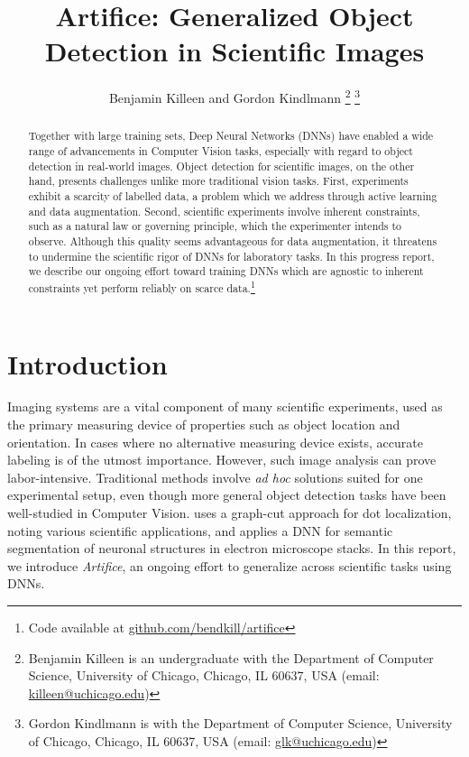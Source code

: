 \documentclass[10pt, journal]{IEEEtran}
\title{Artifice: Generalized Object Detection in Scientific Images}
\author{Benjamin Killeen and Gordon Kindlmann %
  \thanks{Benjamin Killeen is an undergraduate with the Department of Computer
    Science, University of Chicago, Chicago, IL 60637, USA (email:
    \href{mailto:killeen@uchicago.edu}{killeen@uchicago.edu})} %
  \thanks{Gordon Kindlmann is with the Department of Computer Science,
    University of Chicago, Chicago, IL 60637, USA (email:
    \href{mailto:glk@uchicago.edu}{glk@uchicago.edu})} %
}
\begin{document}
\maketitle

\begin{abstract}
  Together with large training sets, Deep Neural Networks (DNNs) have enabled a
  wide range of advancements in Computer Vision tasks, especially with regard to
  object detection in real-world images. Object detection for scientific images,
  on the other hand, presents challenges unlike more traditional vision
  tasks. First, experiments exhibit a scarcity of labelled data, a problem which
  we address through active learning and data augmentation. Second, scientific
  experiments involve inherent constraints, such as a natural law or governing
  principle, which the experimenter intends to observe. Although this quality
  seems advantageous for data augmentation, it threatens to undermine the
  scientific rigor of DNNs for laboratory tasks. In this progress report, we
  describe our ongoing effort toward training DNNs which are agnostic to
  inherent constraints yet perform reliably on scarce data.\footnote{Code
    available at \href{https://github.com/bendkill/artifice}
    {github.com/bendkill/artifice}}
\end{abstract}

\section{Introduction}
\label{sec:introduction}

Imaging systems are a vital component of many scientific experiments, used as
the primary measuring device of properties such as object location and
orientation. In cases where no alternative measuring device exists, accurate
labeling is of the utmost importance. However, such image analysis can prove
labor-intensive. Traditional methods involve \emph{ad hoc} solutions suited for
one experimental setup, even though more general object detection tasks have
been well-studied in Computer Vision. \cite{bernardis_finding_2010} uses a
graph-cut approach for dot localization, noting various scientific applications,
and \cite{ronneberger_u-net:_2015} applies a DNN for semantic segmentation of
neuronal structures in electron microscope stacks. In this report, we introduce
\emph{Artifice}, an ongoing effort to generalize across scientific tasks using
DNNs.
\end{document}
